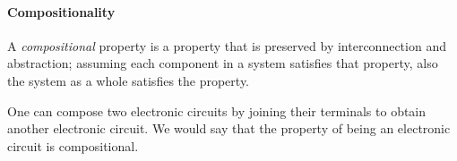 \paragraph{Compositionality}
A \emph{compositional} property is a property that is preserved by interconnection and abstraction;
assuming each component in a system satisfies that property, also the system as a whole satisfies the property.

\begin{example}
    One can compose two electronic circuits by joining their terminals to obtain
    another electronic circuit. We would say that the property
    of being an electronic circuit is compositional.
\end{example}


